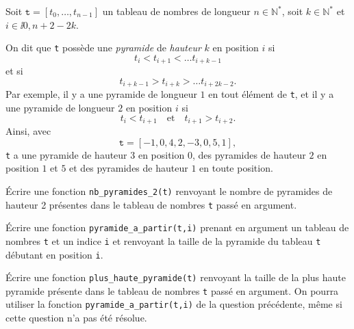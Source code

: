\exer{}
\setcounter{numques}{0}

Soit $\texttt{t} = [t_0,\dots,t_{n-1}]$ un tableau de nombres de longueur $n\in\mathbb{N}^\ast$, soit $k \in \mathbb{N}^\ast$ et $i \in \ii{0,n+2-2k}$.

On dit que \texttt{t} possède une \emph{pyramide} de \emph{hauteur} $k$ en position $i$ si
\begin{equation*}
  t_{i} < t_{i+1} < \dots t_{i+k-1}
\end{equation*}
et si 
\begin{equation*}
  t_{i+k-1} > t_{i+k} > \dots t_{i+2k-2}.
\end{equation*}
Par exemple, il y a une pyramide de longueur $1$ en tout élément de \texttt{t}, et il y a une pyramide de longueur $2$ en position $i$ si 
\begin{equation*}
  t_i < t_{i+1} \quad\textrm{et}\quad t_{i+1}> t_{i+2}.
\end{equation*}
Ainsi, avec 
\begin{equation*}
  \texttt{t} = [-1,0,4,2,-3,0,5,1],
\end{equation*}
\texttt{t} a une pyramide de hauteur 3 en position $0$, des pyramides de hauteur $2$ en position $1$ et $5$ et des pyramides de hauteur $1$ en toute position.
\bigskip{}

\question{} Écrire une fonction \texttt{nb\_pyramides\_2(t)} renvoyant le nombre de pyramides de hauteur 2 présentes dans le tableau de nombres \texttt{t} passé en argument. 

\medskip{}

\question{} Écrire une fonction \texttt{pyramide\_a\_partir(t,i)} prenant en argument un tableau de nombres \texttt{t} et un indice \texttt{i} et renvoyant la taille de la pyramide du tableau \texttt{t} débutant en position \texttt{i}.

\medskip{}

\question{} Écrire une fonction \texttt{plus\_haute\_pyramide(t)} renvoyant la taille de la plus haute pyramide présente dans le tableau de nombres \texttt{t} passé en argument. 
On pourra utiliser la fonction \texttt{pyramide\_a\_partir(t,i)} de la question précédente, même si cette question n'a pas été résolue. 